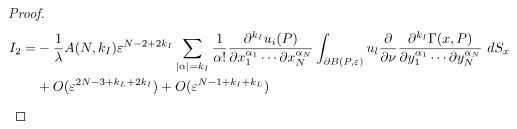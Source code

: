\documentclass[11pt,reqno]{article}
\numberwithin{equation}{section}
\newcommand\e\varepsilon
\newcommand\la\lambda
\begin{document}
\begin{proof}

    \begin{equation}
        \begin{aligned}
            I_2
                    =&-\frac{1}{\la}A(N,{ k_I})\e^{N-2+2{ k_I}}	\sum_{|\alpha|={ k_I}}\frac1{\alpha!}
					\frac{\partial^{{ k_I}}u_i(P)}{\partial x_1^{\alpha_1}\cdots\partial x_N^{\alpha_N}}\int_{\partial B(P,\e)} u_l\frac{\partial}{\partial \nu}\frac{\partial^{{ k_I}}\Gamma(x,P)}{\partial y_1^{\alpha_1}\cdots\partial y_N^{\alpha_N}}\ dS_x\\
                    &+O(\e^{2N-3+{ k_L}+2{{ k_I}}})+O(\e^{N-1+{{ k_I}}+{ k_L}})\vspace{2mm}\\

\end{aligned}
\end{equation}
\end{proof}
\end{document}
